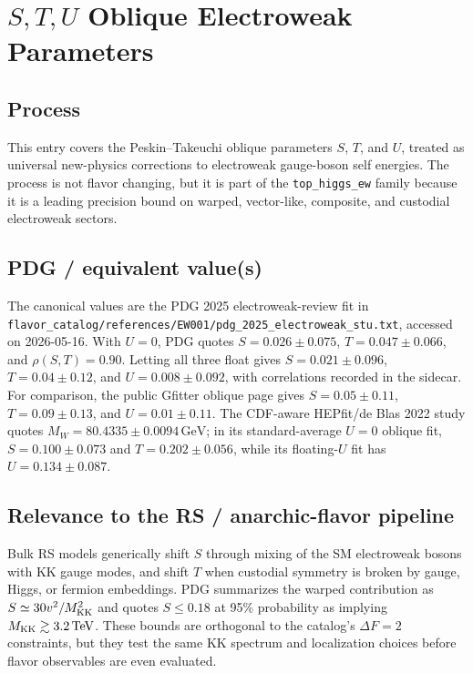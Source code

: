 
\section{\texorpdfstring{\(S,T,U\) Oblique Electroweak Parameters}{S,T,U Oblique Electroweak Parameters}}

\subsection*{Process}
This entry covers the Peskin--Takeuchi oblique parameters \(S\), \(T\), and
\(U\), treated as universal new-physics corrections to electroweak gauge-boson
self energies.  The process is not flavor changing, but it is part of the
\texttt{top\_higgs\_ew} family because it is a leading precision bound on
warped, vector-like, composite, and custodial electroweak sectors.

\subsection*{PDG / equivalent value(s)}
The canonical values are the PDG 2025 electroweak-review fit in
\texttt{flavor\_catalog/references/EW001/pdg\_2025\_electroweak\_stu.txt},
accessed on 2026-05-16.  With \(U=0\), PDG quotes
\(S=0.026\pm0.075\), \(T=0.047\pm0.066\), and
\(\rho(S,T)=0.90\).  Letting all three float gives
\(S=0.021\pm0.096\), \(T=0.04\pm0.12\), and
\(U=0.008\pm0.092\), with correlations recorded in the sidecar.
For comparison, the public Gfitter oblique page gives
\(S=0.05\pm0.11\), \(T=0.09\pm0.13\), and \(U=0.01\pm0.11\).
The CDF-aware HEPfit/de Blas 2022 study quotes
\(M_W=80.4335\pm0.0094\,\mathrm{GeV}\); in its standard-average
\(U=0\) oblique fit, \(S=0.100\pm0.073\) and \(T=0.202\pm0.056\),
while its floating-\(U\) fit has \(U=0.134\pm0.087\).

\subsection*{Relevance to the RS / anarchic-flavor pipeline}
Bulk RS models generically shift \(S\) through mixing of the SM electroweak
bosons with KK gauge modes, and shift \(T\) when custodial symmetry is broken
by gauge, Higgs, or fermion embeddings.  PDG summarizes the warped contribution
as \(S\simeq 30 v^2/M_{\rm KK}^2\) and quotes \(S\leq0.18\) at 95\%
probability as implying \(M_{\rm KK}\gtrsim3.2\,\mathrm{TeV}\).  These bounds
are orthogonal to the catalog's \(\Delta F=2\) constraints, but they test the
same KK spectrum and localization choices before flavor observables are even
evaluated.

